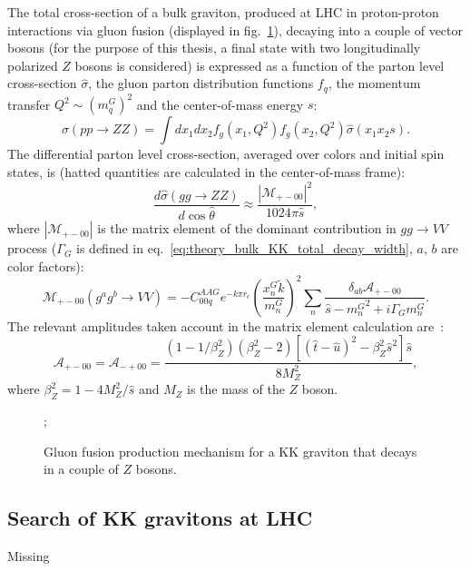 The total cross-section of a bulk graviton, produced at LHC in proton-proton interactions via gluon fusion (displayed in fig.~\ref{fig:theory_KK_gg_prod}), decaying into a couple of vector bosons (for the purpose of this thesis, a final state with two longitudinally polarized $Z$ bosons is considered) is expressed as a function of the parton level cross-section $\hat{\sigma}$, the gluon parton distribution functions $f_q$, the momentum transfer $Q^2 \sim (m_q^G)^2$ and the center-of-mass energy $s$:
\begin{equation}
\sigma(pp \rightarrow ZZ) = \int dx_1 dx_2 f_g(x_1,Q^2) f_g(x_2, Q^2) \hat{\sigma}(x_1 x_2 s).
\label{eq:theory_cross_section_bulk}
\end{equation}
The differential parton level cross-section, averaged over colors and initial spin states, is (hatted quantities are calculated in the center-of-mass frame):
\begin{equation}
\frac{d \hat{\sigma}(gg \rightarrow ZZ)}{d \cos{\hat{\theta}}} \approx \frac{ \left| \mathcal{M}_{+-00}\right|^2}{1024 \pi \hat{s}},
\label{eq:theory_parton_level_cross_section_bulk}
\end{equation}
where $\left| \mathcal{M}_{+-00}\right|$ is the matrix element of the dominant contribution in $gg \rightarrow VV$ process ($\Gamma_G$ is defined in eq.~\ref{eq:theory_bulk_KK_total_decay_width}, $a$, $b$ are color factors):
\begin{equation}
\mathcal{M}_{+-00} (g^a g^b \rightarrow VV) = -C_{00q}^{AAG} e^{-k \pi r_c} \left( \frac{x^G_n \tilde{k}}{m_n^G}\right)^2 \sum_n \frac{\delta_{ab} \mathcal{A}_{+-00}}{\hat{s} - {m_n^G}^2 +i \Gamma_G m_n^G}.
\label{eq:theory_KK_matrix_elements}
\end{equation}
The relevant amplitudes taken account in the matrix element calculation are~\cite{Agashe:2007zd}:
\begin{equation}
\mathcal{A}_{+-00} = \mathcal{A}_{-+00} = \frac{\left( 1 - 1/\beta_Z^2 \right) \left( \beta_Z^2 -2\right) \left[ (\hat{t} - \hat{u})^2 - \beta_Z^2\hat{s}^2 \right] \hat{s} }{8 M_Z^2},
\label{eq:theory_KK_amplitudes}
\end{equation}
where $\beta_Z^2 = 1- 4M_Z^2/\hat{s}$ and $M_Z$ is the mass of the $Z$ boson.

\begin{figure}[!htb]
  \centering
{};
\caption{Gluon fusion production mechanism for a KK graviton that decays in a couple of $Z$ bosons.}
\label{fig:theory_KK_gg_prod}
\end{figure}


\subsection{Search of KK gravitons at LHC}
Missing

\clearpage

